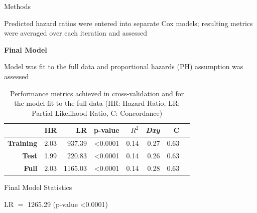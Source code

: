 \documentclass[final]{beamer}
\newlength{\onecolwid}
\begin{document}
\begin{frame}[t]
\begin{columns}[t]
\begin{column}{\onecolwid}
\begin{block}{Methods}
\vspace{0.25ex}

Predicted hazard ratios were entered into separate Cox models; resulting metrics were averaged over each iteration and assessed

\vspace{0.25ex}

\textcolor{dblue!70}{} \textcolor{dblue!70}{\textbf{Final Model}} 

\vspace{0.25ex}

Model was fit to the full data and proportional hazards (PH) assumption was assessed

\vspace{2.5ex}

\end{block}


% 

\begin{table}[!htbp]
\captionsetup{skip=40pt}
\vspace{2.5ex}
\begin{tabular}{|r|r|r|r|r|r|r|r|}
  \hline
  & \textbf{HR} & \textbf{LR} & \textbf{p-value} & \textbf{$R^2$} & \textbf{\textit{Dxy}} & \textbf{C} \\
  \hline
  \textbf{Training} & 2.03 & 937.39  & \textless0.0001 & 0.14 & 0.27 & 0.63 \\
  \textbf{Test}     & 1.99 & 220.83  & \textless0.0001 & 0.14 & 0.26 & 0.63 \\
  \textbf{Full}     & 2.03 & 1165.03 & \textless0.0001 & 0.14 & 0.28 & 0.63 \\
  \hline
\end{tabular}
\caption{Performance metrics achieved in cross-validation and for the model fit to the full data (HR: Hazard Ratio, LR: Partial Likelihood Ratio, C: Concordance)}
\label{table:1}
\end{table}

\vspace{3ex}


\begin{block}{Final Model Statistics}

\textcolor{dblue!70}{} LR $=$ 1265.29 (p-value \textless0.0001)


\end{block}
\end{column}
\end{columns}
\end{frame}
\end{document}

